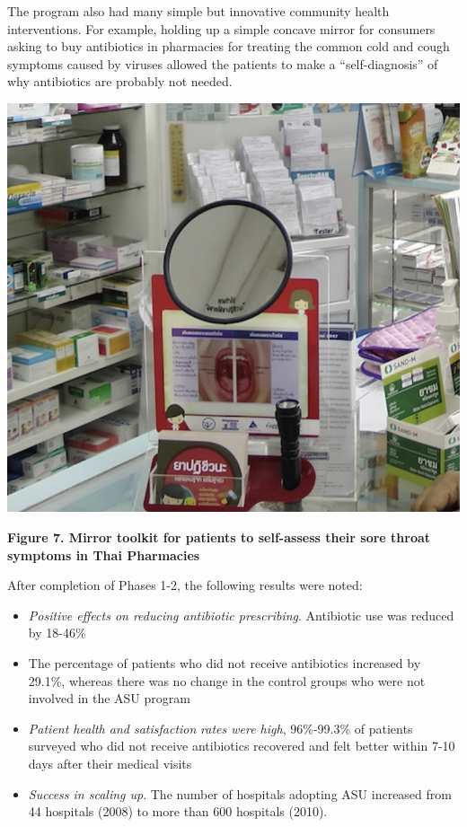 \documentclass[
  11pt,
  paper=a4,
  ,captions=tableheading
]{scrartcl}
\providecommand{\tightlist}{%
  \setlength{\itemsep}{0pt}\setlength{\parskip}{0pt}}
\begin{document}
The program also had many simple but innovative community health
interventions. For example, holding up a simple concave mirror for
consumers asking to buy antibiotics in pharmacies for treating the
common cold and cough symptoms caused by viruses allowed the patients to
make a ``self-diagnosis'' of why antibiotics are probably not needed.

\includegraphics[width=6.25in,height=\textheight]{images/mirror.png}

\textbf{Figure 7. Mirror toolkit for patients to self-assess their sore
throat symptoms in Thai Pharmacies}

After completion of Phases 1-2, the following results were noted:

\begin{itemize}
\tightlist
\item
  \emph{Positive effects on reducing antibiotic prescribing}. Antibiotic
  use was reduced by 18-46\%
\item
  The percentage of patients who did not receive antibiotics increased
  by 29.1\%, whereas there was no change in the control groups who were
  not involved in the ASU program
\item
  \emph{Patient health and satisfaction} \emph{rates were high},
  96\%-99.3\% of patients surveyed who did not receive antibiotics
  recovered and felt better within 7-10 days after their medical visits
\item
  \emph{Success in scaling up}. The number of hospitals adopting ASU
  increased from 44 hospitals (2008) to more than 600 hospitals (2010).
\end{itemize}
\end{document}
